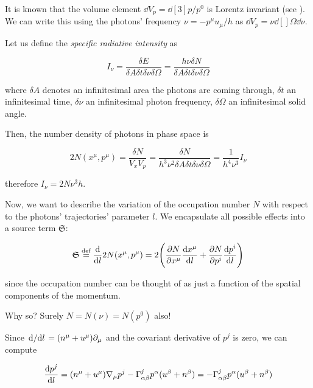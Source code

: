 \documentclass[main.tex]{subfiles}
\begin{document}
It is known that the volume element \(\dd{V}_p = \dd[3]{p} / p^0 \) is Lorentz invariant (see \cite[box 22.5]{MisnerThorneWheeler:1973}).
We can write this using the photons' frequency \(\nu = - p^\mu u_\mu / h\) as \(\dd{V}_p = \nu \dd[]{\Omega} \dd{\nu} \).

Let us define the \emph{specific radiative intensity} as

\begin{equation}
  I_\nu = \frac{\delta E}{\delta A \delta  t \delta \nu \delta \Omega}
  = \frac{h \nu \delta N}{\delta A \delta  t \delta \nu \delta \Omega}
\end{equation}

where \(\delta A\) denotes an infinitesimal area the photons are coming through, \(\delta t\) an infinitesimal time, \(\delta \nu\) an infinitesimal photon frequency, \(\delta \Omega\) an infinitesimal solid angle.

Then, \cite[figure 22.2]{MisnerThorneWheeler:1973} the number density of photons in phase space is

\begin{equation}
  2N(x^\mu, p^\mu) = \frac{\delta N}{V_x V_p} =  \frac{\delta N}{h^3 \nu^2\delta A \delta  t \delta \nu \delta \Omega} = \frac{1}{h^4 \nu^3} I_\nu
\end{equation}

therefore \(I_\nu = 2 N \nu^3 h\).

Now, we want to describe the variation of the occupation number \(N\) with respect to the photons' trajectories' parameter \(l\). We encapsulate all possible effects into a source term \(\mathfrak S\):

\begin{equation}
    \mathfrak S \stackrel{\text{def}}{=} \dv{}{l} 2N(x^\mu, p^\mu) =
    2 \qty(\pdv{N}{x^\mu} \dv{x^\mu}{l} + \pdv{N}{p^i} \dv{p^i}{l}  )
\end{equation}

since the occupation number can be thought of as just a function of the spatial components of the momentum.

\begin{greenbox}
  Why so? Surely \(N = N(\nu) = N(p^0)\) also!
\end{greenbox}

Since \(\dv*{}{l} = (n^\mu + u^\mu) \partial_\mu\) and the covariant derivative of \(p^j\) is zero, we can compute

\begin{equation}
  \dv{p^j}{l} = (n^\mu + u^\mu ) \nabla_\mu p^j - \Gamma ^j _{\alpha \beta} p^\alpha (u^\beta + n^\beta)
  = - \Gamma ^j _{\alpha \beta} p^\alpha (u^\beta + n^\beta)
\end{equation}
\end{document}
